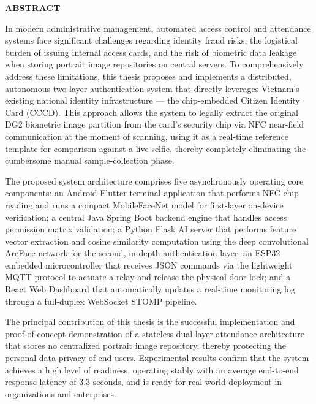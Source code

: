 \documentclass[../DoAn.tex]{subfiles}
\begin{document}
\begin{center}
    \Large{\textbf{ABSTRACT}}\\
\end{center}
\vspace{1cm}

In modern administrative management, automated access control and attendance systems face significant challenges regarding identity fraud risks, the logistical burden of issuing internal access cards, and the risk of biometric data leakage when storing portrait image repositories on central servers. To comprehensively address these limitations, this thesis proposes and implements a distributed, autonomous two-layer authentication system that directly leverages Vietnam's existing national identity infrastructure — the chip-embedded Citizen Identity Card (CCCD). This approach allows the system to legally extract the original DG2 biometric image partition from the card's security chip via NFC near-field communication at the moment of scanning, using it as a real-time reference template for comparison against a live selfie, thereby completely eliminating the cumbersome manual sample-collection phase.

The proposed system architecture comprises five asynchronously operating core components: an Android Flutter terminal application that performs NFC chip reading and runs a compact MobileFaceNet model for first-layer on-device verification; a central Java Spring Boot backend engine that handles access permission matrix validation; a Python Flask AI server that performs feature vector extraction and cosine similarity computation using the deep convolutional ArcFace network for the second, in-depth authentication layer; an ESP32 embedded microcontroller that receives JSON commands via the lightweight MQTT protocol to actuate a relay and release the physical door lock; and a React Web Dashboard that automatically updates a real-time monitoring log through a full-duplex WebSocket STOMP pipeline.

The principal contribution of this thesis is the successful implementation and proof-of-concept demonstration of a stateless dual-layer attendance architecture that stores no centralized portrait image repository, thereby protecting the personal data privacy of end users. Experimental results confirm that the system achieves a high level of readiness, operating stably with an average end-to-end response latency of 3.3 seconds, and is ready for real-world deployment in organizations and enterprises.
\end{document}

